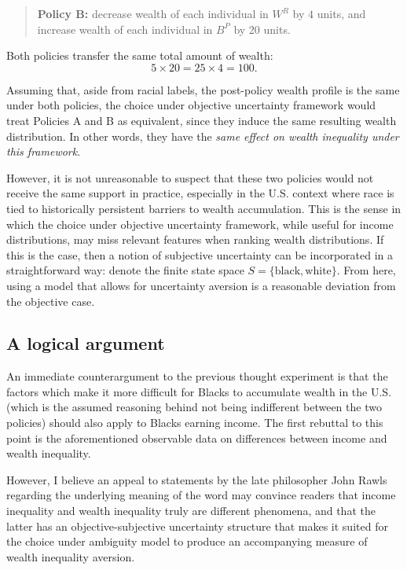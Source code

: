 \documentclass[../../../00-main.tex]{subfiles}
\begin{document}
\begin{quote}
\textbf{Policy B:} decrease wealth of each individual in $W^R$ by $4$ units, and increase wealth of each individual in $B^P$ by $20$ units.
\end{quote}

\par Both policies transfer the same total amount of wealth:
\[
5\times 20 = 25\times 4 = 100.
\]

\par Assuming that, aside from racial labels, the post-policy wealth profile is the same under both policies, the choice under objective uncertainty framework would treat Policies A and B as equivalent, since they induce the same resulting wealth distribution. In other words, they have the \textit{same effect on wealth inequality under this framework}.

\par However, it is not unreasonable to suspect that these two policies would not receive the same support in practice, especially in the U.S. context where race is tied to historically persistent barriers to wealth accumulation. This is the sense in which the choice under objective uncertainty framework, while useful for income distributions, may miss relevant features when ranking wealth distributions. If this is the case, then a notion of subjective uncertainty can be incorporated in a straightforward way: denote the finite state space $S=\{\text{black},\text{white}\}$. From here, using a model that allows for uncertainty aversion is a reasonable deviation from the objective case.


\subsection{A logical argument}

\par An immediate counterargument to the previous thought experiment is that the factors which make it more difficult for Blacks to accumulate wealth in the U.S. (which is the assumed reasoning behind not being indifferent between the two policies) should also apply to Blacks earning income. The first rebuttal to this point is the aforementioned observable data on differences between income and wealth inequality.  

\par However, I believe an appeal to statements by the late philosopher John Rawls regarding the underlying meaning of the word  may convince readers that income inequality and wealth inequality truly are different phenomena, and that the latter has an objective-subjective uncertainty structure that makes it suited for the choice under ambiguity model to produce an accompanying measure of wealth inequality aversion. 
\end{document}

